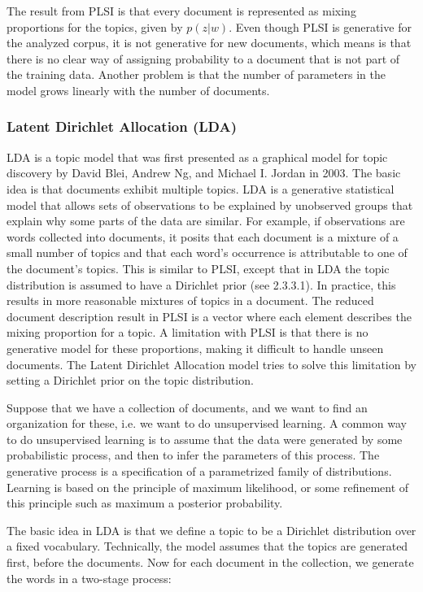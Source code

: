 \documentclass[12pt]{report}
\begin{document}
The result from PLSI is that every document is represented as mixing proportions for 
the topics, given by $p(z|w)$. Even though PLSI is generative for the analyzed corpus, 
it is not generative for new documents, which means is that there is no clear way of 
assigning probability to a document that is not part of the training data. Another 
problem is that the number of parameters in the model grows linearly with the number 
of documents.


\subsubsection{Latent Dirichlet Allocation (LDA)}

LDA is a topic model that was first presented as a graphical model for topic discovery 
by David Blei, Andrew Ng, and Michael I. Jordan in 2003. The basic idea is that 
documents exhibit multiple topics. LDA is a generative statistical model that allows 
sets of observations to be explained by unobserved groups that explain why some parts 
of the data are similar. For example, if observations are words collected into 
documents, it posits that each document is a mixture of a small number of topics and 
that each word's occurrence is attributable to one of the document's topics. This is 
similar to PLSI, except that in LDA the topic distribution is assumed to have a 
Dirichlet prior (see 2.3.3.1). In practice, this results in more reasonable mixtures 
of topics in a document. The reduced document description result in PLSI is a vector 
where each element describes the mixing proportion for a topic. A limitation with 
PLSI is that there is no generative model for these proportions, making it difficult 
to handle unseen documents. The Latent Dirichlet Allocation model tries to solve 
this limitation by setting a Dirichlet prior on the topic distribution.
 
Suppose that we have a collection of documents, and we want to find an organization 
for these, i.e. we want to do unsupervised learning. A common way to do unsupervised 
learning is to assume that the data were generated by some probabilistic process, 
and then to infer the parameters of this process. The generative process is a 
specification of a parametrized family of distributions. Learning is based on the 
principle of maximum likelihood, or some refinement of this principle such as maximum 
a posterior probability.
 
The basic idea in LDA is that  we define a topic to be a Dirichlet distribution over 
a fixed vocabulary. Technically, the model assumes that the topics are generated 
first, before the documents. Now for each document in the collection, we generate 
the words in a two-stage process:
\end{document}
